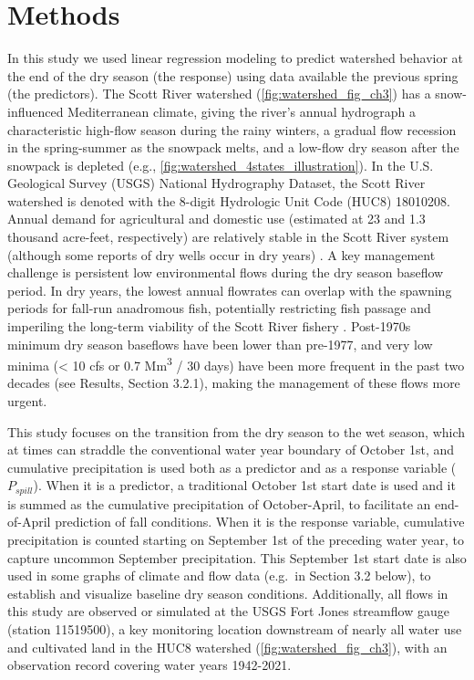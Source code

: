 \documentclass[hess, manuscript]{copernicus}
\begin{document}
\section{Methods}

In this study we used linear regression modeling to predict watershed
behavior at the end of the dry season (the response) using data
available the previous spring (the predictors). The Scott River
watershed (\autoref{fig:watershed_fig_ch3}) has a snow-influenced
Mediterranean climate, giving the river's annual hydrograph a
characteristic high-flow season during the rainy winters, a gradual flow
recession in the spring-summer as the snowpack melts, and a low-flow dry
season after the snowpack is depleted (e.g.,
\autoref{fig:watershed_4states_illustration}). In the U.S. Geological
Survey (USGS) National Hydrography Dataset, the Scott River watershed is
denoted with the 8-digit Hydrologic Unit Code (HUC8) 18010208. Annual
demand for agricultural and domestic use (estimated at 23 and 1.3
thousand acre-feet, respectively) \citeyearpar[DWR][]{DWR2004} are
relatively stable in the Scott River system (although some reports of
dry wells occur in dry years) \citeyearpar[Siskiyou
County][]{SiskiyouCounty2021}. A key management challenge is persistent
low environmental flows during the dry season baseflow period. In dry
years, the lowest annual flowrates can overlap with the spawning periods
for fall-run anadromous fish, potentially restricting fish passage and
imperiling the long-term viability of the Scott River fishery
\citeyearpar[Siskiyou County][]{SiskiyouCounty2021}. Post-1970s minimum
dry season baseflows have been lower than pre-1977, and very low minima
(\textless{} 10 cfs or 0.7 Mm\textsuperscript{3} / 30 days) have been
more frequent in the past two decades (see Results, Section 3.2.1),
making the management of these flows more urgent.

This study focuses on the transition from the dry season to the wet
season, which at times can straddle the conventional water year boundary
of October 1st, and cumulative precipitation is used both as a predictor
and as a response variable (\(P_{spill}\)). When it is a predictor, a
traditional October 1st start date is used and it is summed as the
cumulative precipitation of October-April, to facilitate an end-of-April
prediction of fall conditions. When it is the response variable,
cumulative precipitation is counted starting on September 1st of the
preceding water year, to capture uncommon September precipitation. This
September 1st start date is also used in some graphs of climate and flow
data (e.g.~in Section 3.2 below), to establish and visualize baseline
dry season conditions. Additionally, all flows in this study are
observed or simulated at the USGS Fort Jones streamflow gauge (station
11519500), a key monitoring location downstream of nearly all water use
and cultivated land in the HUC8 watershed
(\autoref{fig:watershed_fig_ch3}), with an observation record covering
water years 1942-2021.
\end{document}
